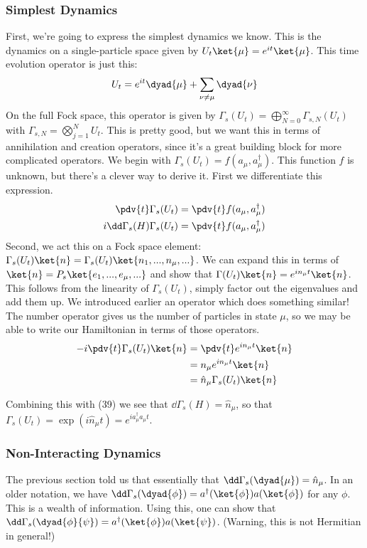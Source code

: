 \documentclass{article}
\begin{document}
\subsubsection{Simplest Dynamics}
First, we're going to express the simplest dynamics we know. This is the dynamics on a single-particle space given by $U_t \ket{\mu} = e^{it}\ket{\mu}$. This time evolution operator is just this: \[U_t = e^{it}\dyad{\mu}+\sum_{\nu\neq\mu}\dyad{\nu}\]
On the full Fock space, this operator is given by $\Gamma_s(U_t) = \bigoplus_{N=0}^\infty \Gamma_{s,N}(U_t)$ with $\Gamma_{s,N} = \bigotimes_{j=1}^N U_t$. This is pretty good, but we want this in terms of annihilation and creation operators, since it's a great building block for more complicated operators. We begin with $\Gamma_s(U_t) = f(a_\mu,a_\mu^\dagger)$. This function $f$ is unknown, but there's a clever way to derive it. First we differentiate this expression.
\begin{align}
\pdv{t} \Gamma_s(U_t) &= \pdv{t}f(a_\mu,a_\mu^\dagger)\\
i\dd\Gamma_s(H)\Gamma_s(U_t) &= \pdv{t}f(a_\mu,a_\mu^\dagger)
\end{align}
Second, we act this on a Fock space element: $\Gamma_s(U_t)\ket{n} = \Gamma_s(U_t) \ket{n_1,...,n_\mu,...}$. We can expand this in terms of $\ket{n} = P_s\ket{e_1,...,e_\mu,...}$ and show that $\Gamma(U_t)\ket{n} = e^{in_\mu t} \ket{n}$. This follows from the linearity of $\Gamma_s(U_t)$, simply factor out the eigenvalues and add them up. We introduced earlier an operator which does something similar! The number operator gives us the number of particles in state $\mu$, so we may be able to write our Hamiltonian in terms of those operators.
\begin{align}
-i\pdv{t}\Gamma_s(U_t)\ket{n} &= \pdv{t} e^{in_\mu t}\ket{n}\\
&=n_\mu e^{in_\mu t}\ket{n}\\
&= \hat n_\mu \Gamma_s(U_t)\ket{n}
\end{align}

Combining this with (39) we see that $\dd \Gamma_s(H) = \hat n_\mu$, so that $\Gamma_s(U_t) = \exp(i\hat n_\mu t) = e^{i a_\mu^\dagger a_\mu t}$.

\subsubsection{Non-Interacting Dynamics}
The previous section told us that essentially that $\dd \Gamma_s(\dyad{\mu}) = \hat n_\mu$.  In an older notation, we have $\dd\Gamma_s(\dyad{\phi}) = a^\dagger(\ket{\phi}) a(\ket{\phi})$ for any $\phi$. This is a wealth of information. Using this, one can show that $\dd\Gamma_s(\dyad{\phi}{\psi}) = a^\dagger(\ket{\phi})a(\ket{\psi})$. (Warning, this is not Hermitian in general!)
\end{document}
